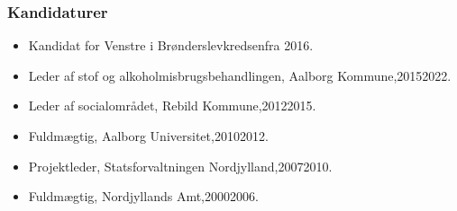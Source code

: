 \documentclass[11pt, a4paper]{awesome-cv}
\begin{document}
\begin{cvletter}
\subsubsection*{Kandidaturer}
\begin{itemize}
\item Kandidat for Venstre i Brønderslevkredsenfra 2016.
\end{itemize}
\begin{itemize}
\item Leder af stof og alkoholmisbrugsbehandlingen, Aalborg Kommune,20152022.
\item Leder af socialområdet, Rebild Kommune,20122015.
\item Fuldmægtig, Aalborg Universitet,20102012.
\item Projektleder, Statsforvaltningen Nordjylland,20072010.
\item Fuldmægtig, Nordjyllands Amt,20002006.
\end{itemize}
\end{cvletter}
\end{document}
